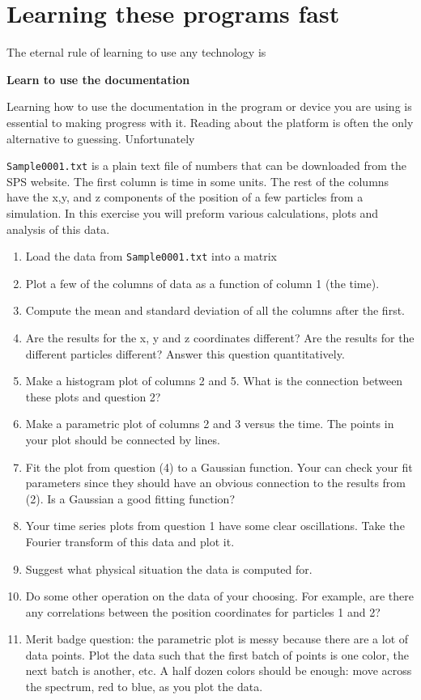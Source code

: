 \section{Learning these programs fast}

The eternal rule of learning to use any technology is
\begin{center}
\begin{framed}
\bf \Large{Learn to use the documentation}
\end{framed}
\end{center}
Learning how to use the documentation in the program or device you are using is essential to making progress with it. Reading about the platform is often the only alternative to guessing. Unfortunately

\begin{framed}
\texttt{Sample0001.txt} is a plain text file of numbers that can be downloaded from the SPS website. The first column is time
in some units. The rest of the columns have the x,y, and z components of the position of a few particles from a simulation. In this exercise you will preform various calculations, plots and analysis of this data. \\ 
\begin{enumerate}
\item Load the data from \texttt{Sample0001.txt} into a matrix
\item Plot a few of the columns of data as a function of column 1 (the time).
\item Compute the mean and standard deviation of all the columns after the
first.
\item Are the results for the x, y and z coordinates different? Are the results for
the different particles different? Answer this question quantitatively.
\item Make a histogram plot of columns 2 and 5. What is the connection between
these plots and question 2?
\item Make a parametric plot of columns 2 and 3 versus the time. The points in
your plot should be connected by lines.
\item Fit the plot from question (4) to a Gaussian function. Your can check your
fit parameters since they should have an obvious connection to the results from
(2). Is a Gaussian a good fitting function?
\item Your time series plots from question 1 have some clear oscillations. Take
the Fourier transform of this data and plot it.
\item Suggest what physical situation the data is computed for.
\item Do some other operation on the data of your choosing. For example, are
there any correlations between the position coordinates for particles 1 and 2?
\item Merit badge question: the parametric plot is messy because there are a
lot of data points. Plot the data such that the first batch of points is one color,
the next batch is another, etc. A half dozen colors should be enough: move across
the spectrum, red to blue, as you plot the data.
\end{enumerate}
\end{framed}
